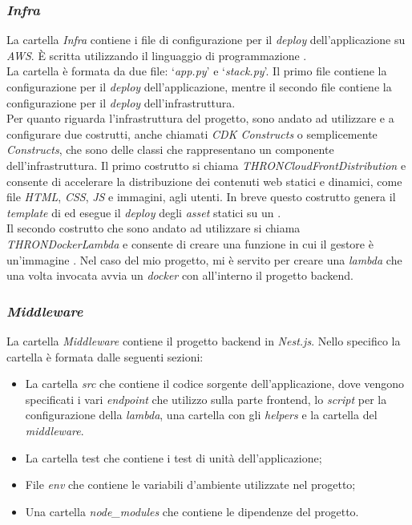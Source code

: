 \subsubsection*{\emph{Infra}}
La cartella \textit{Infra} contiene i file di configurazione per il \textit{deploy} dell'applicazione su \textit{AWS}. È scritta utilizzando il linguaggio di programmazione .\\
La cartella è formata da due file: `\textit{app.py}' e `\textit{stack.py}'. Il primo file contiene la configurazione per il \textit{deploy} dell'applicazione, mentre il secondo file contiene la configurazione per il \textit{deploy} dell'infrastruttura.\\
Per quanto riguarda l'infrastruttura del progetto, sono andato ad utilizzare e a configurare due costrutti, anche chiamati \textit{CDK Constructs} o semplicemente \textit{Constructs}, che sono delle classi che rappresentano un componente dell'infrastruttura.
Il primo costrutto si chiama \textit{THRONCloudFrontDistribution} e consente di accelerare la distribuzione dei contenuti web statici e dinamici, come file \textit{HTML}, \textit{CSS}, \textit{JS} e immagini, agli utenti.
In breve questo costrutto genera il \textit{template} di  ed esegue il \textit{deploy} degli \textit{asset} statici su un .\\
Il secondo costrutto che sono andato ad utilizzare si chiama \textit{THRONDockerLambda} e consente di creare una funzione  in cui il gestore è un'immagine .
Nel caso del mio progetto, mi è servito per creare una \textit{lambda} che una volta invocata avvia un \textit{docker} con all'interno il progetto backend.\\

\subsubsection*{\emph{Middleware}}
La cartella \textit{Middleware} contiene il progetto backend in \textit{Nest.js}. Nello specifico la cartella è formata dalle seguenti sezioni:
\begin{itemize}
  \item La cartella \textit{src} che contiene il codice sorgente dell'applicazione, dove vengono specificati i vari \textit{endpoint} che utilizzo sulla parte frontend, lo \textit{script} per la configurazione
  della \textit{lambda}, una cartella con gli \textit{helpers} e la cartella del \textit{middleware}.
  \item La cartella test che contiene i test di unità dell'applicazione;
  \item File \textit{env} che contiene le variabili d'ambiente utilizzate nel progetto;
  \item Una cartella \textit{node\_modules} che contiene le dipendenze del progetto.
\end{itemize}

